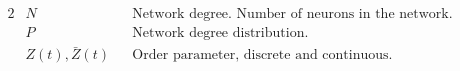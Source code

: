 %
%

\begin{alignat*}{2}
&N &&\text{Network degree. Number of neurons in the network.}\\
&P &&\text{Network degree distribution.}\\
&Z(t), \bar{Z}(t) &&\text{Order parameter, discrete and continuous.}\\
\end{alignat*}
